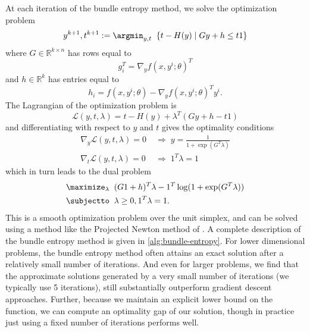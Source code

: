 At each iteration of the bundle entropy method, we solve the optimization
problem
\begin{equation}
y^{k+1}, t^{k+1} :=  \argmin_{y, t} \;\; \{t - H(y) \mid G y + h \leq t1 \}
\end{equation}
where $G \in \mathbb{R}^{k \times n}$ has rows equal to
\begin{equation}
g_i^T = \nabla_y f (x, y^i;\theta)^T
\end{equation}
and $h \in \mathbb{R}^k$ has entries equal to
\begin{equation}
h_i = f(x, y^i;\theta) - \nabla_y f (x, y^i;\theta)^T y^i.
\end{equation}
The Lagrangian of the optimization problem is
\begin{equation}
\mathcal{L}(y,t,\lambda) = t - H(y) + \lambda^T(G y + h - t1)
\end{equation}
and differentiating with respect to $y$ and $t$ gives the optimality conditions
\begin{equation}
\begin{split}
\nabla_y \mathcal{L}(y,t,\lambda) = 0 & \; \Longrightarrow \; y = \frac{1}{1 +
\exp(G^T \lambda)} \\
\nabla_t \mathcal{L}(y,t,\lambda) = 0 & \; \Longrightarrow \; 1^T \lambda = 1
\end{split}
\end{equation}
which in turn leads to the dual problem
\begin{equation}
\begin{split}
\maximize_\lambda \;\; &(G1 + h)^T \lambda - 1^T\log(1 + \exp(G^T\lambda)) \\
\subjectto \;\; & \lambda \geq 0, 1^T \lambda = 1.
\end{split}
\end{equation}
This is a smooth optimization problem over the unit simplex, and can be solved using
a method like
the Projected Newton method of \citep[pg. 241, eq. 97]{bertsekas1982projected}.
A complete description of the bundle entropy
method is given in \cref{alg:bundle-entropy}.
For lower dimensional problems, the bundle entropy method often attains an exact
solution after a relatively small number of iterations. And even for larger
problems, we find that the approximate solutions generated by a very
small number of iterations (we typically use 5 iterations), still
substantially outperform gradient descent approaches. Further, because we
maintain an explicit lower bound on the function, we can compute an
optimality gap of our solution, though in practice just using a fixed number of
iterations performs well.

